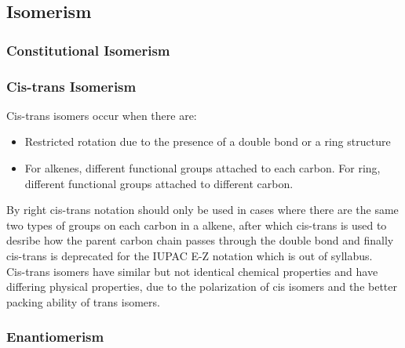 \documentclass[../main]{subfiles}
\begin{document}

	\subsection{Isomerism}

	\subsubsection{Constitutional Isomerism}


	\subsubsection{Cis-trans Isomerism}


	Cis-trans isomers occur when there are:

	\begin{itemize}
		\item Restricted rotation due to the presence of a  double bond or a ring structure
		\item For alkenes, different functional groups attached to each carbon. For ring, different functional groups attached to different carbon.
	\end{itemize}

	By right cis-trans notation should only be used in cases where there are the same two types of groups on each carbon in a alkene, after which cis-trans is used to desribe how the parent carbon chain passes through the double bond and finally cis-trans is deprecated for the IUPAC E-Z notation which is out of syllabus. \\

	Cis-trans isomers have similar but not identical chemical properties and have differing physical properties, due to the polarization of cis isomers and the better packing ability of trans isomers.

	\subsubsection{Enantiomerism}
\end{document}
